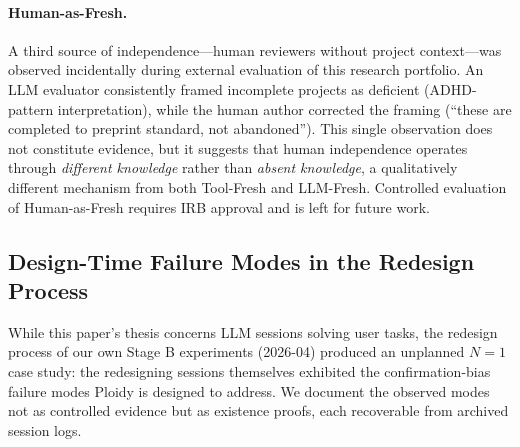 \documentclass[11pt]{article}
\begin{document}
\paragraph{Human-as-Fresh.}
A third source of independence---human reviewers without project context---was observed incidentally during external evaluation of this research portfolio. An LLM evaluator consistently framed incomplete projects as deficient (ADHD-pattern interpretation), while the human author corrected the framing (``these are completed to preprint standard, not abandoned''). This single observation does not constitute evidence, but it suggests that human independence operates through \emph{different knowledge} rather than \emph{absent knowledge}, a qualitatively different mechanism from both Tool-Fresh and LLM-Fresh. Controlled evaluation of Human-as-Fresh requires IRB approval and is left for future work.

\subsection{Design-Time Failure Modes in the Redesign Process}
\label{sec:design-time-failures}

While this paper's thesis concerns LLM sessions solving user tasks, the
redesign process of our own Stage B experiments (2026-04) produced an
unplanned $N=1$ case study: the redesigning sessions themselves exhibited
the confirmation-bias failure modes Ploidy is designed to address. We
document the observed modes not as controlled evidence but as existence
proofs, each recoverable from archived session logs.
\end{document}

